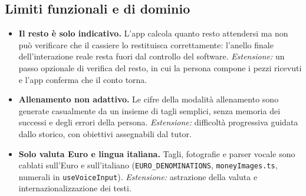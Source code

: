 \documentclass[11pt,a4paper]{article}
\begin{document}
\subsection{Limiti funzionali e di dominio}
\begin{itemize}[leftmargin=1.4cm]
  \item \textbf{Il resto \`e solo indicativo.} L'app calcola quanto resto attendersi ma non pu\`o
  verificare che il cassiere lo restituisca correttamente: l'anello finale dell'interazione reale
  resta fuori dal controllo del software. \emph{Estensione:} un passo opzionale di verifica del
  resto, in cui la persona compone i pezzi ricevuti e l'app conferma che il conto torna.
  \item \textbf{Allenamento non adattivo.} Le cifre della modalit\`a allenamento sono generate
  casualmente da un insieme di tagli semplici, senza memoria dei successi e degli errori della
  persona. \emph{Estensione:} difficolt\`a progressiva guidata dallo storico, con obiettivi
  assegnabili dal tutor.
  \item \textbf{Solo valuta Euro e lingua italiana.} Tagli, fotografie e parser vocale sono
  cablati sull'Euro e sull'italiano (\texttt{EURO\_DENOMINATIONS}, \texttt{moneyImages.ts},
  numerali in \texttt{useVoiceInput}). \emph{Estensione:} astrazione della valuta e
  internazionalizzazione dei testi.
\end{itemize}
\end{document}
